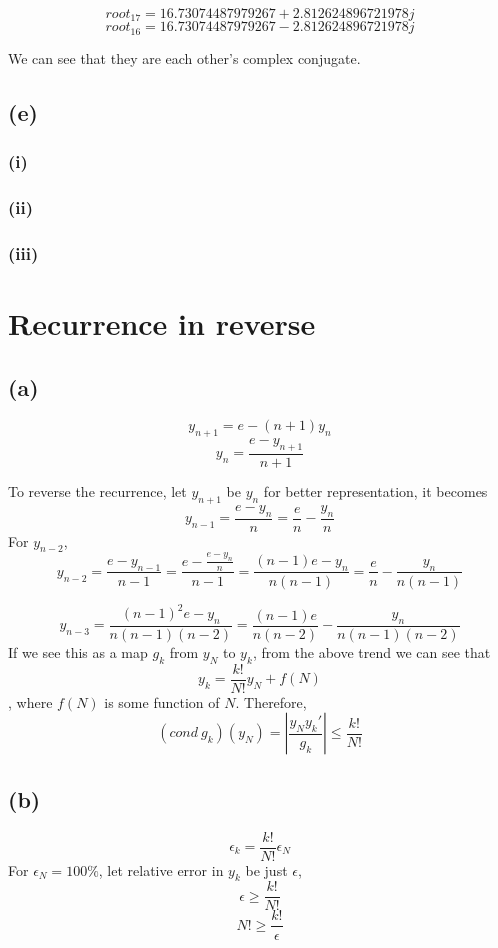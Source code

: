 \documentclass[a4paper, 12pt]{article}
\begin{document}
\[root_{17} = 16.73074487979267+2.812624896721978j\]
\[root_{16} = 16.73074487979267-2.812624896721978j\]

We can see that they are each other's complex conjugate.


\subsection*{(e)}
\subsubsection*{(i)}



\subsubsection*{(ii)}



\subsubsection*{(iii)}


\section{Recurrence in reverse}


\subsection*{(a)}
\[y_{n+1} = e-(n+1)y_n\]
\[y_n = \frac{e-y_{n+1}}{n+1}\]

To reverse the recurrence, let $y_{n+1}$ be $y_n$ for better representation, it becomes
\[y_{n-1} = \frac{e-y_n}{n} = \frac{e}{n}-\frac{y_n}{n}\]
For $y_{n-2}$,
\[y_{n-2} = \frac{e-y_{n-1}}{n-1} = \frac{e-\frac{e-y_n}{n}}{n-1}=\frac{(n-1)e-y_n}{n(n-1)}= \frac{e}{n}-\frac{y_n}{n(n-1)}\]

\[y_{n-3} = \frac{(n-1)^2e-y_n}{n(n-1)(n-2)}=\frac{(n-1)e}{n(n-2)}-\frac{y_n}{n(n-1)(n-2)}\]
If we see this as a map $g_k$ from $y_N$ to $y_k$, from the above trend we can see that
\[y_k = \frac{k!}{N!}y_N + f(N)\]
, where $f(N)$ is some function of $N$. Therefore,
\[(cond\ g_k)(y_N) = |\frac{y_Ny_k'}{g_k}| \leq \frac{k!}{N!}\]


\subsection*{(b)}
\[\epsilon_k = \frac{k!}{N!}\epsilon_N\]
For $\epsilon_N = 100\%$, let relative error in $y_k$ be just $\epsilon$,
\[\epsilon \geq \frac{k!}{N!}\]
\[N! \geq \frac{k!}{\epsilon}\]
\end{document}
